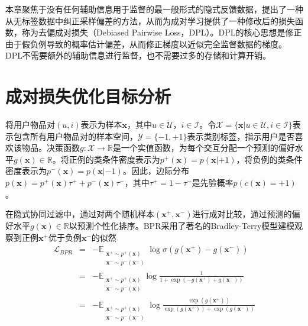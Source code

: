 本章聚焦于没有任何辅助信息用于监督的最一般形式的隐式反馈数据，提出了一种从无标签数据中纠正采样偏差的方法，从而为成对学习提供了一种修改后的损失函数，称为去偏成对损失（Debiased Pairwise Loss，DPL）。DPL的核心思想是修正由于假负例导致的概率估计偏差，从而修正梯度以近似完全监督数据的梯度。DPL不需要额外的辅助信息进行监督，也不需要过多的存储和计算开销。

\section{成对损失优化目标分析}
将用户物品对$(u,i)$表示为样本$\mathbf{x}$，其中$u\in \mathcal{U}$，$i\in \mathcal{I}$。令$\mathcal{X}= \{\mathbf x|u\in \mathcal{U}, i\in \mathcal{I}\}$表示包含所有用户物品对的样本空间，$\mathcal{Y} =\{-1,+1\}$表示类别标签，指示用户是否喜欢该物品。决策函数$g:\mathcal{X} \rightarrow \mathbb{R}$是一个实值函数，为每个交互分配一个预测的偏好水平$g(\mathbf x) \in \mathbb{R}$。将正例的类条件密度表示为$p^+(\mathbf x) = p(\mathbf x|+1)$，将负例的类条件密度表示为$p^-(\mathbf x) = p(\mathbf x|-1)$。因此，边际分布$p(\mathbf x)=p^+(\mathbf x) \tau^+ +p^-(\mathbf x)\tau^-$，其中$\tau^+ = 1-\tau^-$是先验概率$p(c(\mathbf{x}) = +1)$。

在隐式协同过滤中，通过对两个随机样本$(\mathbf{x}^+, \mathbf{x}^-)$进行成对比较，通过预测的偏好水平$g(\mathbf x) \in \mathbb{R}$以预测个性化排序。BPR\cite{Steffen:2009:UAI}采用了著名的Bradley-Terry模型建模观察到正例$\mathbf{x}^+$优于负例$\mathbf{x}^-$的似然
\begin{eqnarray}\label{eq:bpr}
	\mathcal{L}_{BPR} &=& - \mathbb{E}_{\substack{\mathbf x^+ \sim p^+(\mathbf x) \\ \mathbf x^- \sim p^-(\mathbf x^-)}} \log \sigma(g(\mathbf{x}^+) - g(\mathbf{x}^-)) \\
	&=&  - \mathbb{E}_{\substack{\mathbf x^+ \sim p^+(\mathbf x) \\ \mathbf x^- \sim p^-(\mathbf x)}}\log \frac{1}{1+\exp(-g(\mathbf{x}^+) + g(\mathbf{x}^-))} \nonumber \\
	&=&  - \mathbb{E}_{\substack{\mathbf x^+ \sim p^+(\mathbf x) \\ \mathbf x^- \sim p^-(\mathbf x^-)}}\log\frac{\exp(g(\mathbf{x}^+))}{\exp(g(\mathbf{x}^+))+\exp( g(\mathbf{x}^-))} \label{eq:infonce1}
\end{eqnarray}

